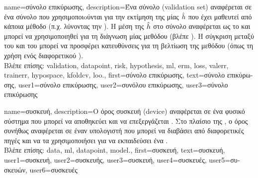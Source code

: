 {name={\foreignlanguage{greek}{σύνολο επικύρωσης}},
 	description={\foreignlanguage{greek}{Ένα σύνολο}  (validation set) 
		\foreignlanguage{greek}{αναφέρεται σε ένα σύνολο}  \foreignlanguage{greek}{που 
  		χρησιμοποι\-oύ\-νται για την εκτίμηση της}  \foreignlanguage{greek}{μίας}  $\hat{h}$ 
		\foreignlanguage{greek}{που έχει μαθευτεί από κάποια μέθοδο}  \foreignlanguage{greek}{(π.χ. λύνοντας την} 
		). \foreignlanguage{greek}{Η μέση}  \foreignlanguage{greek}{της} $\hat{h}$ 
  		\foreignlanguage{greek}{στο σύνολο}  \foreignlanguage{greek}{αναφέρεται ως το}  
		\foreignlanguage{greek}{και μπορεί να χρησιμοποιηθεί για τη διάγνωση μίας μεθόδου}  (\foreignlanguage{greek}{βλέπε} 
		\cite[\foreignlanguage{greek}{Ενότητα} 6.6]{MLBasics}). \foreignlanguage{greek}{Η σύγκριση μεταξύ του}  
		\foreignlanguage{greek}{και του}  \foreignlanguage{greek}{μπορεί να προσφέρει κατευθύνσεις για τη βελτίωση της 
		μεθόδου}  \foreignlanguage{greek}{(όπως τη χρήση ενός διαφορετικού} ).
		\\
		\foreignlanguage{greek}{Βλέπε επίσης:} \gls{validation}, \gls{datapoint}, \gls{risk}, \gls{hypothesis}, \gls{ml}, \gls{erm}, \gls{loss}, \gls{valerr}, 
		\gls{trainerr}, \gls{hypospace}, \gls{kfoldcv}, \gls{loo}.},
	first={\foreignlanguage{greek}{σύνολο επικύρωσης}},
	text={\foreignlanguage{greek}{σύνολο επικύρωσης}},
	user1={\foreignlanguage{greek}{σύνολο επικύρωσης}}, %
	user2={\foreignlanguage{greek}{συνόλου επικύρωσης}}, %
	user3={\foreignlanguage{greek}{σύνολο επικύρωσης}} %
}

{name={\foreignlanguage{greek}{συσκευή}},
	description={\foreignlanguage{greek}{Ο όρος συσκευή} (device)  
		\foreignlanguage{greek}{αναφέρεται σε ένα φυσικό σύστημα που μπορεί να}
		\foreignlanguage{greek}{αποθηκεύει και να επεξεργάζεται} . \foreignlanguage{greek}{Στο πλαίσιο της} 
		, \foreignlanguage{greek}{ο όρος συνήθως αναφέρεται σε έναν υπολογιστή που μπορεί 
		να διαβάσει}  \foreignlanguage{greek}{από διαφορετικές πηγές και να τα χρησιμοποιήσει 
		για να εκπαιδεύσει ένα}   \cite{Patterson2013}. 
		\\
		\foreignlanguage{greek}{Βλέπε επίσης:} \gls{data}, \gls{ml}, \gls{datapoint}, \gls{model}.},
	first={\foreignlanguage{greek}{συσκευή}},
	text={\foreignlanguage{greek}{συσκευή}},
	user1={\foreignlanguage{greek}{συσκευή}}, %
	user2={\foreignlanguage{greek}{συσκευής}}, %
	user3={\foreignlanguage{greek}{συσκευή}}, %
	user4={\foreignlanguage{greek}{συσκευές}}, %
	user5={\foreignlanguage{greek}{συσκευών}}, %
	user6={\foreignlanguage{greek}{συσκευές}} %
}

